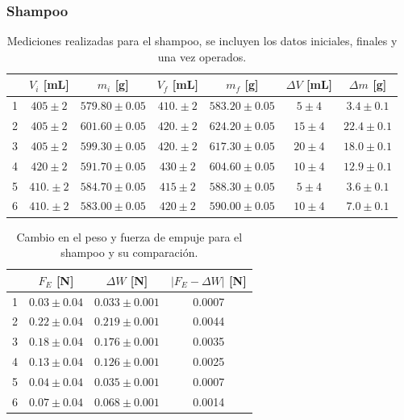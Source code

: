 \documentclass[a4paper]{article}
\begin{document}
\subsubsection*{Shampoo}
\begin{table}[H]
  \centering
    \begin{tabular}{|c|c|c|c|c|c|c|} \hline
     & $V_i$ [mL] & $m_i$ [g] & $V_f$ [mL] & $m_f$ [g] & $\Delta V$ [mL] & $\Delta m$ [g] \\ \hline
    1     & $405\pm2$ & $579.80\pm0.05$ & $410.\pm2$ & $583.20\pm0.05$ & $5\pm4$ & $3.4\pm0.1$ \\ \hline
    2     & $405\pm2$ & $601.60\pm0.05$ & $420.\pm2$ & $624.20\pm0.05$ & $15\pm4$ & $22.4\pm0.1$ \\ \hline
    3     & $405\pm2$ & $599.30\pm0.05$ & $420.\pm2$ & $617.30\pm0.05$ & $20\pm4$ & $18.0\pm0.1$ \\ \hline
    4     & $420\pm2$ & $591.70\pm0.05$ & $430\pm2$ & $604.60\pm0.05$ & $10\pm4$ & $12.9\pm0.1$ \\ \hline
    5     & $410.\pm2$ & $584.70\pm0.05$ & $415\pm2$ & $588.30\pm0.05$ & $5\pm4$ & $3.6\pm0.1$ \\ \hline
    6     & $410.\pm2$ & $583.00\pm0.05$ & $420\pm2$ & $590.00\pm0.05$ & $10\pm4$ & $7.0\pm0.1$ \\ \hline
    \end{tabular}
  \caption{Mediciones realizadas para el shampoo, se incluyen los datos iniciales, finales y una vez operados.}
\end{table}%

\begin{table}[H]
  \centering
    \begin{tabular}{|c|c|c|c|} \hline
          & $F_E$ [N] & $\Delta W$ [N] & $| F_E - \Delta W |$ [N] \\ \hline
    1     & $0.03\pm0.04$ & $0.033\pm0.001$ & 0.0007 \\ \hline
    2     & $0.22\pm0.04$ & $0.219\pm0.001$ & 0.0044 \\ \hline
    3     & $0.18\pm0.04$ & $0.176\pm0.001$ & 0.0035 \\ \hline
    4     & $0.13\pm0.04$ & $0.126\pm0.001$ & 0.0025 \\ \hline
    5     & $0.04\pm0.04$ & $0.035\pm0.001$ & 0.0007 \\ \hline
    6     & $0.07\pm0.04$ & $0.068\pm0.001$ & 0.0014 \\ \hline
    \end{tabular}%
  \caption{Cambio en el peso y fuerza de empuje para el shampoo y su comparación.}
\end{table}%
\end{document}
